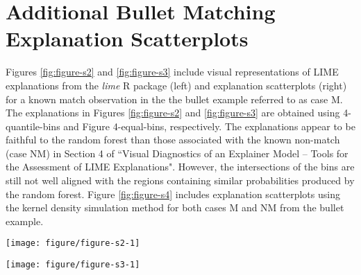 \documentclass[9pt]{article}\usepackage[]{graphicx}\usepackage[]{color}
\newenvironment{knitrout}{}{} %
\begin{document}
\section{Additional Bullet Matching Explanation Scatterplots} \label{bullets-plus}

Figures \ref{fig:figure-s2} and \ref{fig:figure-s3} include visual representations of LIME explanations from the \emph{lime} R package (left) and explanation scatterplots (right) for a known match observation in the the bullet example referred to as case M. The explanations in Figures \ref{fig:figure-s2} and \ref{fig:figure-s3} are obtained using 4-quantile-bins and Figure 4-equal-bins, respectively. The explanations appear to be faithful to the random forest than those associated with the known non-match (case NM) in Section 4 of ``Visual Diagnostics of an Explainer Model -- Tools for the Assessment of LIME Explanations". However, the intersections of the bins are still not well aligned with the regions containing similar probabilities produced by the random forest. Figure \ref{fig:figure-s4} includes explanation scatterplots using the kernel density simulation method for both cases M and NM from the bullet example.

\vspace{0.5cm}



\renewcommand{\thefigure}{S2}
\begin{figure*}[!h]
\begin{knitrout}
\color{fgcolor}

{\centering \texttt{[image: figure/figure-s2-1]} 

}



\end{knitrout}
\caption{Explanation plot from \emph{lime} R package (left) and explanation scatterplot (right) for case M in the bullet test data for 4-quantile-bins.}
\label{fig:figure-s2}
\end{figure*}

\renewcommand{\thefigure}{S3}
\begin{figure*}[!h]
\begin{knitrout}
\color{fgcolor}

{\centering \texttt{[image: figure/figure-s3-1]} 

}



\end{knitrout}
\caption{Explanation plot from \emph{lime} R package (left) and explanation scatterplot (right) for case M in the bullet test data for 4-equal-bins.}
\label{fig:figure-s3}
\end{figure*}
\end{document}
